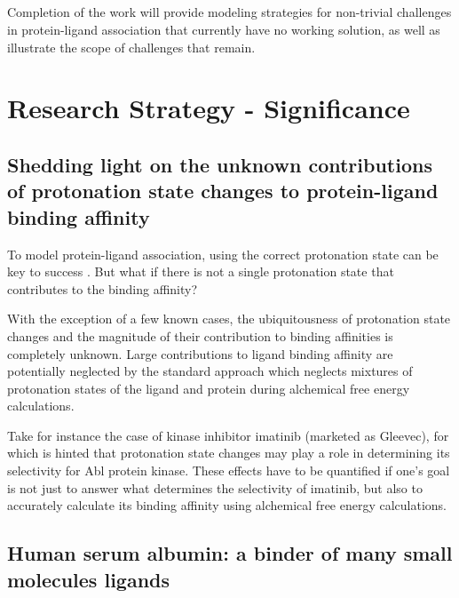 \documentclass[10pt,final]{article}
\newif\ifinstr
\newcommand{\instr}[1]{\ifdraft{\ifinstr {\color{cyan}\emph{#1}} \fi}{}}
\begin{document}
\subsection*{} %

Completion of the work will provide modeling strategies for non-trivial challenges in protein-ligand association that currently have no working solution, as well as illustrate the scope of challenges that remain.

\section*{Research Strategy - Significance}
\instr{General background, significance in terms of basic science and disease relevance.}


\subsection*{Shedding light on the unknown contributions of protonation state changes to protein-ligand binding affinity}
To model protein-ligand association, using the correct protonation state can be key to success \cite{Polgar2005a,Wittayanarakul2008a}. But what if there is not a single protonation state that contributes to the binding affinity?

With the exception of a few known cases\cite{Aleksandrov2007a,Czodrowski2007a,Steuber2007a,Czodrowski2007b}, the ubiquitousness of protonation state changes and the magnitude of their contribution to binding affinities is completely unknown. Large contributions to ligand binding affinity are potentially neglected by the standard approach which neglects mixtures of protonation states of the ligand and protein during alchemical free energy calculations.

Take for instance the case of kinase inhibitor imatinib (marketed as Gleevec), for which is hinted that protonation state changes may play a role in determining its selectivity for Abl protein kinase\cite{Lin2013a}. These effects have to be quantified if one's goal is not just to answer what determines the selectivity of imatinib, but also to accurately calculate its binding affinity using alchemical free energy calculations.

\subsection*{Human serum albumin: a binder of many small molecules ligands}
\end{document}
